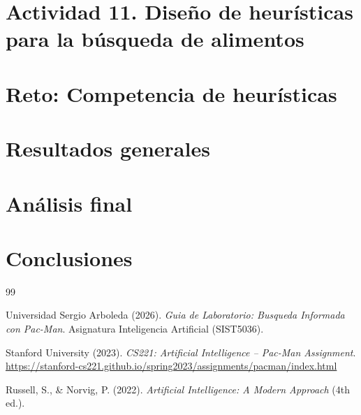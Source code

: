 \documentclass[12pt,a4paper]{article}
\begin{document}
\section{Actividad 11. Diseño de heurísticas para la búsqueda de alimentos}


\section{Reto: Competencia de heurísticas}


\section{Resultados generales}


\section{Análisis final}


\section{Conclusiones}


\newpage
\begin{thebibliography}{99}

Universidad Sergio Arboleda (2026). \textit{Guia de Laboratorio: Busqueda Informada con Pac-Man}.
Asignatura Inteligencia Artificial (SIST5036).

Stanford University (2023). \textit{CS221: Artificial Intelligence -- Pac-Man Assignment}.
\url{https://stanford-cs221.github.io/spring2023/assignments/pacman/index.html}

Russell, S., \& Norvig, P. (2022). \textit{Artificial Intelligence: A Modern Approach} (4th ed.).

\end{thebibliography}
\end{document}
